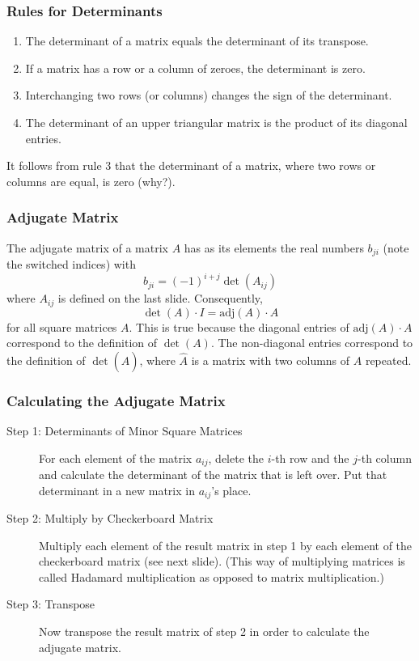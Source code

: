 \documentclass[xcolor=dvipsnames]{beamer}
\begin{document}
\begin{frame}
  \frametitle{Rules for Determinants}
  \begin{enumerate}
  \item The determinant of a matrix equals the determinant of its
    transpose.
  \item If a matrix has a row or a column of zeroes, the determinant
    is zero.
  \item Interchanging two rows (or columns) changes the sign of the
    determinant.
  \item The determinant of an upper triangular matrix is the product
    of its diagonal entries.
  \end{enumerate}
  It follows from rule 3 that the determinant of a matrix, where two
  rows or columns are equal, is zero (why?). 
\end{frame}

\begin{frame}
  \frametitle{Adjugate Matrix}
The \alert{adjugate matrix} of a matrix $A$ has as its elements the
real numbers $b_{ji}$ (note the switched indices) with
\begin{equation}
  \label{eq:quesieha}
  b_{ji}=(-1)^{i+j}\det(A_{ij})
\end{equation}
where $A_{ij}$ is defined on the last slide. Consequently,
\begin{equation}
  \label{eq:iegoowae}
  \det(A)\cdot{}I=\mbox{adj}(A)\cdot{}A
\end{equation}
for all square matrices $A$. This is true because the diagonal entries
of $\mbox{adj}(A)\cdot{}A$ correspond to the definition of $\det(A)$.
The non-diagonal entries correspond to the definition of
$\det(\hat{A})$, where $\hat{A}$ is a matrix with two columns of $A$
repeated.
\end{frame}

\begin{frame}
  \frametitle{Calculating the Adjugate Matrix}
  \begin{description}
  \item[Step 1: Determinants of Minor Square Matrices] For each
    element of the matrix $a_{ij}$, delete the $i$-th row and the
    $j$-th column and calculate the determinant of the matrix that is
    left over. Put that determinant in a new matrix in $a_{ij}$'s
    place.
  \item[Step 2: Multiply by Checkerboard Matrix] Multiply each element
    of the result matrix in step 1 by each element of the checkerboard
    matrix (see next slide). (This way of multiplying matrices is
    called Hadamard multiplication as opposed to matrix
    multiplication.)
  \item[Step 3: Transpose] Now transpose the result matrix of step 2
    in order to calculate the adjugate matrix.
  \end{description}
\end{frame}
\end{document}
